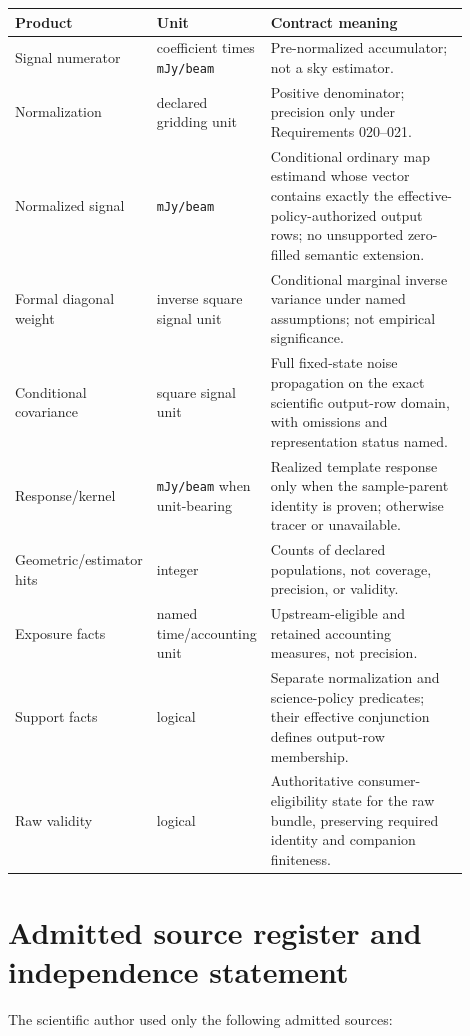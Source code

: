 \documentclass[10pt]{article}
\newcommand{\code}[1]{\nolinkurl{#1}}
\begin{document}
\begin{longtable}{L{0.23\linewidth}L{0.18\linewidth}L{0.49\linewidth}}
\toprule
Product & Unit & Contract meaning\\
\midrule
Signal numerator & coefficient times \code{mJy/beam} & Pre-normalized
accumulator; not a sky estimator.\\
Normalization & declared gridding unit & Positive denominator; precision only
under Requirements 020--021.\\
Normalized signal & \code{mJy/beam} & Conditional ordinary map estimand whose
vector contains exactly the effective-policy-authorized output rows; no
unsupported zero-filled semantic extension.\\
Formal diagonal weight & inverse square signal unit & Conditional marginal
inverse variance under named assumptions; not empirical significance.\\
Conditional covariance & square signal unit & Full fixed-state noise
propagation on the exact scientific output-row domain, with omissions and
representation status named.\\
Response/kernel & \code{mJy/beam} when unit-bearing & Realized template response
only when the sample-parent identity is proven; otherwise tracer or unavailable.\\
Geometric/estimator hits & integer & Counts of declared populations, not
coverage, precision, or validity.\\
Exposure facts & named time/accounting unit & Upstream-eligible and retained
accounting measures, not precision.\\
Support facts & logical & Separate normalization and science-policy predicates;
their effective conjunction defines output-row membership.\\
Raw validity & logical & Authoritative consumer-eligibility state for the raw
bundle, preserving required identity and companion finiteness.\\
\bottomrule
\end{longtable}

\clearpage
\section{Admitted source register and independence statement}

The scientific author used only the following admitted sources:
\end{document}
